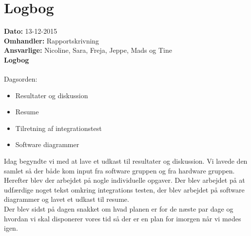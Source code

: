 \section{Logbog}

\textbf{Dato:} 13-12-2015\\
\textbf{Omhandler:} Rapportskrivning\\
\textbf{Ansvarlige:} Nicoline, Sara, Freja, Jeppe, Mads og Tine\\
\textbf{Logbog}
\\
\\
Dagsorden:
\begin{itemize}
	\item Resultater og diskussion
	\item Resume
	\item Tilretning af integrationstest
	\item Software diagrammer
\end{itemize}

Idag begyndte vi med at lave et udkast til resultater og diskussion. Vi lavede den samlet så der både kom input fra software gruppen og fra hardware gruppen.\\
Herefter blev der arbejdet på nogle individuelle opgaver. Der blev arbejdet på at udfærdige noget tekst omkring integrations testen, der blev arbejdet på software diagrammer og lavet et udkast til resume.\\
Der blev sidst på dagen snakket om hvad planen er for de næste par dage og hvordan vi skal disponerer vores tid så der er en plan for imorgen når vi mødes igen.